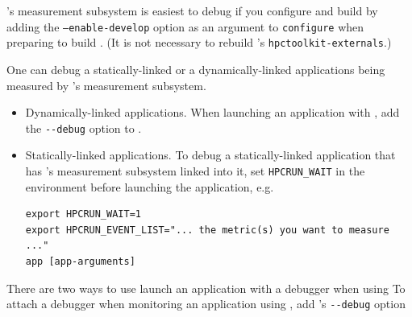 \documentclass[11pt,letterpaper]{report}
\begin{document}
\HPCToolkit{}'s measurement subsystem is easiest to debug if you configure and 
build \HPCToolkit{} by adding the \texttt{--enable-develop} option as an argument to \texttt{configure} when preparing to build \HPCToolkit{}.
(It is not necessary to rebuild \HPCToolkit{}'s \verb|hpctoolkit-externals|.)
%

One can debug a statically-linked or a dynamically-linked applications being measured by 
\HPCToolkit{}'s measurement subsystem. 
\begin{itemize}
\item Dynamically-linked applications. When launching an application with \hpcrun{}, add the \verb|--debug| option to \hpcrun{}.
\item Statically-linked applications. To debug a statically-linked application that has \HPCToolkit{}'s measurement subsystem linked into it, set \verb|HPCRUN_WAIT| in the environment before launching the application, e.g. 
\begin{verbatim}
export HPCRUN_WAIT=1
export HPCRUN_EVENT_LIST="... the metric(s) you want to measure ..."
app [app-arguments]
\end{verbatim}
\end{itemize}

There are two ways to use launch an application with a debugger when using 
To attach a debugger when monitoring an application using \hpcrun{}, add \hpcrun{}'s \verb|--debug| option 
\end{document}
